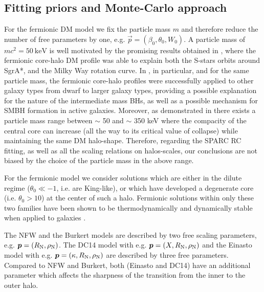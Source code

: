 \subsection{Fitting priors and Monte-Carlo approach}
\label{boundaryC}

For the fermionic DM model we fix the particle mass $m$ and therefore reduce the number of free parameters by one, e.g. $\vec p = (\beta_0, \theta_0, W_0)$. A particle mass of $mc^2 = \SI{50}{\kilo\eV}$ is well motivated by the promising results obtained in \citet{2018PDU....21...82A,2020A&A...641A..34B,2021MNRAS.505L..64B,2022MNRAS.511L..35A}, where the fermionic core-halo DM profile was able to explain both the S-stars orbits around SgrA*, and the Milky Way rotation curve. In \citet{2019PDU....24..278A,2021MNRAS.502.4227A}, in particular, and for the same particle mass, the fermionic core-halo profiles were successfully applied to other galaxy types from dwarf to larger galaxy types, providing a possible explanation for the nature of the intermediate mass BHs, as well as a possible mechanism for SMBH formation in active galaxies. Moreover, as demonstrated in \citet{2018PDU....21...82A} there exists a particle mass range between $\sim$ 50 and $\sim$ 350 keV where the compacity of the central core can increase (all the way to its critical value of collapse) while maintaining the same DM halo-shape. Therefore, regarding the SPARC RC fitting, as well as all the scaling relations on halos-scales, our conclusions are not biased by the choice of the particle mass in the above range.

For the fermionic model we consider solutions which are either in the dilute regime ($\theta_0 \ll -1$, i.e. are King-like), or which have developed a degenerate core (i.e. $\theta_0 > 10$) at the center of such a halo. Fermionic solutions within only these two families have been shown to be thermodynamically and dynamically stable when applied to galaxies \citep{2021MNRAS.502.4227A}.

The NFW and the Burkert models are described by two free scaling parameters, e.g. $\vec p = (R_{\rm N},\rho_{\rm N})$. The DC14 model with e.g. $\vec p = (X, R_{\rm N}, \rho_{\rm N})$ and the Einasto model with e.g. $\vec p = (\kappa, R_{\rm N}, \rho_{\rm N})$ are described by three free parameters. Compared to NFW and Burkert, both (Einasto and DC14) have an additional parameter which affects the sharpness of the transition from the inner to the outer halo.


